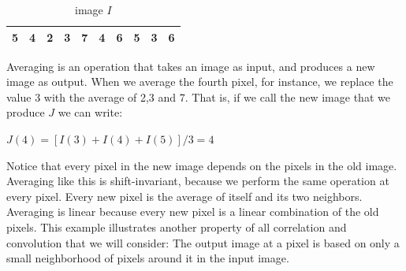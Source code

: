 \documentclass{report}
\begin{document}
\begin{table}[h]
\centering
\label{my-label}
\begin{tabular}{|l|l|l|l|l|l|l|l|l|l|}
\hline
5 & 4 & 2 & 3 & 7 & 4 & 6 & 5 & 3 & 6 \\ \hline
\end{tabular}
\caption{image $I$}
\end{table}

Averaging is an operation that takes an image as input, and produces a new image as output. When we average the fourth pixel, for instance, we replace the value 3 with the average of 2,3 and 7. That is, if we call the new image that we produce $J$ we can write:\newline
    \centerline{$J(4) = [I(3)+I(4)+I(5)]/3 = 4$}\newline
Notice that every pixel in the new image depends on the pixels in the old image. Averaging like this is shift-invariant, because we perform the same operation at every pixel. Every new pixel is the average of itself and its two neighbors. Averaging is linear because every new pixel is a linear combination of the old pixels. This example illustrates another property of all correlation and convolution that we will consider: The output image at a pixel is based on only a small neighborhood of pixels around it in the input image.
\end{document}
